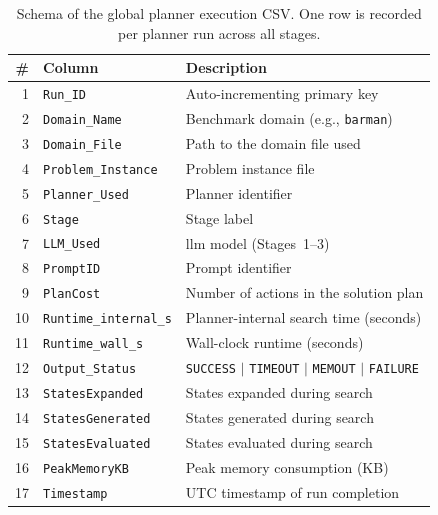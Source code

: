 \begin{table}[htbp]
  \centering
  \caption{Schema of the global planner execution CSV. One row is recorded per planner run across all stages.}
  \label{tab:planner_csv_schema}
  \small
  \begin{tabular}{r l p{7cm}}
    \toprule
    \textbf{\#} & \textbf{Column} & \textbf{Description} \\
    \midrule
    1 & \texttt{Run\_ID} & Auto-incrementing primary key \\
    2 & \texttt{Domain\_Name} & Benchmark domain (e.g., \texttt{barman}) \\
    3 & \texttt{Domain\_File} & Path to the domain file used \\
    4 & \texttt{Problem\_Instance} & Problem instance file \\
    5 & \texttt{Planner\_Used} & Planner identifier \\
    6 & \texttt{Stage} & Stage label \\
    7 & \texttt{LLM\_Used} & \gls{llm} model (Stages~1--3) \\
    8 & \texttt{PromptID} & Prompt identifier \\
    9 & \texttt{PlanCost} & Number of actions in the solution plan \\
    10 & \texttt{Runtime\_internal\_s} & Planner-internal search time (seconds) \\
    11 & \texttt{Runtime\_wall\_s} & Wall-clock runtime (seconds) \\
    12 & \texttt{Output\_Status} & \texttt{SUCCESS} $|$ \texttt{TIMEOUT} $|$ \texttt{MEMOUT} $|$ \texttt{FAILURE} \\
    13 & \texttt{StatesExpanded} & States expanded during search \\
    14 & \texttt{StatesGenerated} & States generated during search \\
    15 & \texttt{StatesEvaluated} & States evaluated during search \\
    16 & \texttt{PeakMemoryKB} & Peak memory consumption (KB) \\
    17 & \texttt{Timestamp} & UTC timestamp of run completion \\
    \bottomrule
  \end{tabular}
\end{table}


